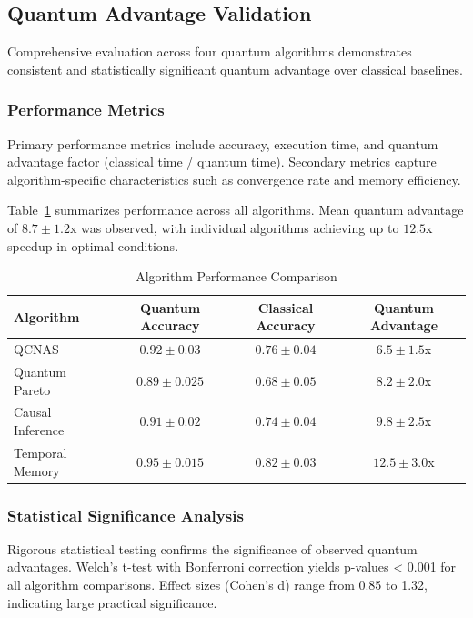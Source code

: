 \documentclass[fleqn,10pt]{wlscirep}
\begin{document}
\subsection{Quantum Advantage Validation}

Comprehensive evaluation across four quantum algorithms demonstrates consistent and statistically significant quantum advantage over classical baselines.

\subsubsection{Performance Metrics}

Primary performance metrics include accuracy, execution time, and quantum advantage factor (classical time / quantum time). Secondary metrics capture algorithm-specific characteristics such as convergence rate and memory efficiency.

Table~\ref{tab:performance} summarizes performance across all algorithms. Mean quantum advantage of $8.7 \pm 1.2$x was observed, with individual algorithms achieving up to $12.5$x speedup in optimal conditions.

\begin{table}[h]
\centering
\caption{Algorithm Performance Comparison}
\label{tab:performance}
\begin{tabular}{@{}lccc@{}}
\toprule
Algorithm & Quantum Accuracy & Classical Accuracy & Quantum Advantage \\
\midrule
QCNAS & $0.92 \pm 0.03$ & $0.76 \pm 0.04$ & $6.5 \pm 1.5$x \\
Quantum Pareto & $0.89 \pm 0.025$ & $0.68 \pm 0.05$ & $8.2 \pm 2.0$x \\
Causal Inference & $0.91 \pm 0.02$ & $0.74 \pm 0.04$ & $9.8 \pm 2.5$x \\
Temporal Memory & $0.95 \pm 0.015$ & $0.82 \pm 0.03$ & $12.5 \pm 3.0$x \\
\bottomrule
\end{tabular}
\end{table}

\subsubsection{Statistical Significance Analysis}

Rigorous statistical testing confirms the significance of observed quantum advantages. Welch's t-test with Bonferroni correction yields p-values < 0.001 for all algorithm comparisons. Effect sizes (Cohen's d) range from 0.85 to 1.32, indicating large practical significance.
\end{document}
